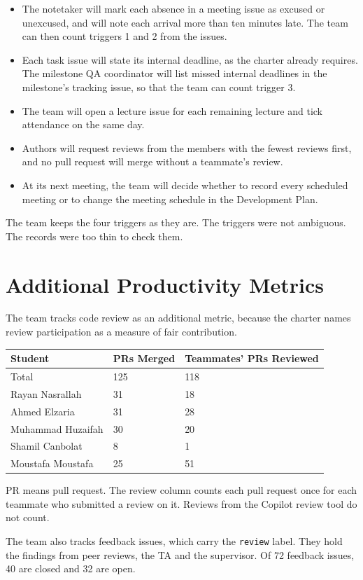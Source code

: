 \documentclass{article}
\begin{document}
\begin{itemize}
    \item The notetaker will mark each absence in a meeting issue as excused
    or unexcused, and will note each arrival more than ten minutes late.
    The team can then count triggers 1 and 2 from the issues.
    \item Each task issue will state its internal deadline, as the charter
    already requires. The milestone QA coordinator will list missed internal
    deadlines in the milestone's tracking issue, so that the team can count
    trigger 3.
    \item The team will open a lecture issue for each remaining lecture and
    tick attendance on the same day.
    \item Authors will request reviews from the members with the fewest
    reviews first, and no pull request will merge without a teammate's
    review.
    \item At its next meeting, the team will decide whether to record every
    scheduled meeting or to change the meeting schedule in the Development
    Plan.
\end{itemize}

The team keeps the four triggers as they are. The triggers were not
ambiguous. The records were too thin to check them.

\section{Additional Productivity Metrics}

The team tracks code review as an additional metric, because the charter
names review participation as a measure of fair contribution.

\begin{table}[H]
\centering
\begin{tabular}{lll}
\toprule
\textbf{Student} & \textbf{PRs Merged} & \textbf{Teammates' PRs Reviewed}\\
\midrule
Total & 125 & 118\\
Rayan Nasrallah & 31 & 18\\
Ahmed Elzaria & 31 & 28\\
Muhammad Huzaifah & 30 & 20\\
Shamil Canbolat & 8 & 1\\
Moustafa Moustafa & 25 & 51\\
\bottomrule
\end{tabular}
\end{table}

PR means pull request. The review column counts each pull request once for
each teammate who submitted a review on it. Reviews from the Copilot review
tool do not count.

The team also tracks feedback issues, which carry the \texttt{review} label.
They hold the findings from peer reviews, the TA and the supervisor. Of 72
feedback issues, 40 are closed and 32 are open.
\end{document}
